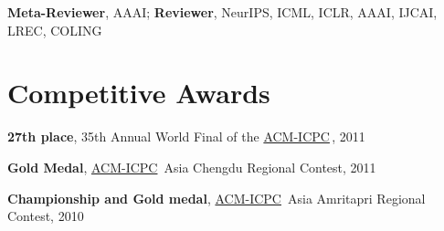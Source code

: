 \documentclass[line,margin]{cv}
\newcommand{\myemph}{\textbf}
\newcommand{\ICPC}{\href{https://icpc.global/}{ACM-ICPC}}
\begin{document}
\begin{resume}
  \myemph{Meta-Reviewer}, AAAI; \myemph{Reviewer}, NeurIPS, ICML, ICLR, AAAI, IJCAI, LREC, COLING

\section{Competitive Awards}


  \myemph{27th place}, 35th Annual World Final of the \ICPC \,, 2011

  \myemph{Gold Medal}, \ICPC\ Asia Chengdu Regional Contest, 2011

  \myemph{Championship and Gold medal}, \ICPC\ Asia Amritapri Regional Contest, 2010

\end{resume}
\end{document}

